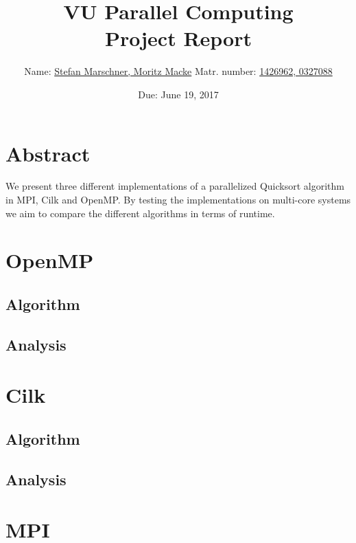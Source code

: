 \documentclass[11pt,a4paper]{article}
\title{VU Parallel Computing\\ 
\Large Project Report}
\author{Name: \underline{Stefan Marschner, Moritz Macke}\qquad
  Matr. number: \underline{1426962, 0327088}}
\date{Due: June 19, 2017}
\begin{document}
\maketitle
\section{Abstract}

We present three different implementations of a parallelized Quicksort algorithm in MPI, Cilk and OpenMP. By testing the implementations on multi-core systems we aim to compare the different algorithms in terms of runtime.

\section{OpenMP}
\subsection{Algorithm}
\subsection{Analysis}
\section{Cilk}
\subsection{Algorithm}
\subsection{Analysis}
\section{MPI}
\end{document}

